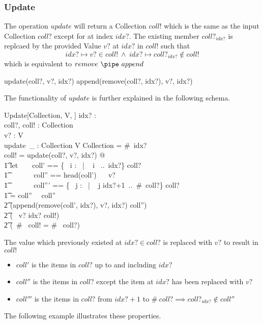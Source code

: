 \documentclass[../../main.tex]{subfiles}
\begin{document}
\subsubsection{Update}
The operation $update$ will return a Collection $coll!$ which is the same as the input Collection $coll?$
except for at index $idx?$. The existing member $coll?_{idx?}$ is replcaed by the provided Value $v?$ at $idx?$ in $coll!$
such that
$$idx? \mapsto v? \in coll! ~ \land ~ idx? \mapsto coll?_{idx?} \not \in coll!$$
which is equivalent to $remove ~\pipe ~append$
\begin{zed}
  update(coll?, v?, idx?) \equiv append(remove(coll?, idx?), v?, idx?)
\end{zed}
The functionality of $update$ is further explained in the following schema.
\begin{schema}{Update[Collection, V, \nat]}
  idx? : \nat \\
  coll?, coll! : Collection \\
  v? : V \\
  update~\_ : Collection \cross V \cross \nat \bij Collection
   = \#~idx? \\
  coll! = update(coll?, v?, idx?) @ \\
  \t1 let ~ ~ coll' == \{~ i : \nat ~| ~ i ~..~idx?\} \extract coll? \\
  \t1 \ \ \ ~~~ coll'' == head(coll') ~\cat ~ v?\\
  \t1 \ \ \ ~~~ coll''' == \{~ j : \nat ~| ~ j \in idx?+1~..~\#~coll?\} \extract coll? \\
  \t1 =  coll'' ~\cat ~coll'' \implies \\
  \t2 (append(remove(coll', idx?), v?, idx?) \cat  coll'') ~ \land \\
  \t2 (~ v? \mapsto idx? \in coll!) ~\land \\
  \t2 (~\#~ coll! = \#~ coll?) ~\land
\end{schema}
The value which previously existed at $idx? \in coll?$ is replaced with $v?$ to result in $coll!$
\begin{itemize}
\item $coll'$ is the items in $coll?$ up to and including $idx?$
\item $coll''$ is the items in $coll?$ except the item at $idx?$ has been replaced with $v?$
\item $coll'''$ is the items in $coll?$ from $idx?+1$ to $\#~coll? \implies coll?_{idx?} \not \in coll''$
\end{itemize}
The following example illustrates these properties.
\end{document}
